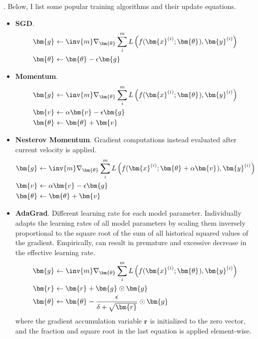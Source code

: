 \documentclass[11pt]{article}
\renewcommand\vec[2][]{\bm{#2}_{#1}}
\newcommand\myspace[1][]{\vspace{#1\bigskipamount}}
\newcommand\p{\Needspace{10\baselineskip} \noindent}
\begin{document}
\myspace
\p {}. Below, I list some popular training algorithms and their update equations. 

\begin{itemize}
	\item \textbf{SGD}.
	\begin{align}
		\vec g &\leftarrow \inv{m} \nabla_{\vec \theta} \sum_i^m L\left(  f(\vec{x}^{(i)}; \vec \theta), \vec{y}^{(i)}   \right) \\
		\vec{\theta} &\leftarrow \vec \theta - \epsilon \vec g
	\end{align}
	
	\item \textbf{Momentum}.
	\begin{align}
		\vec{g} &\leftarrow \inv{m} \nabla_{\vec \theta} \sum_i^m L\left(  f(\vec{x}^{(i)}; \vec \theta), \vec{y}^{(i)}   \right) \\
		\vec{v} &\leftarrow \alpha \vec{v} - \epsilon \vec{g} \\
		\vec{\theta} &\leftarrow \vec \theta + \vec{v} 
	\end{align}
	
	\item \textbf{Nesterov Momentum}. Gradient computations instead evaluated after current velocity is applied.
	\begin{align}
		\vec{g} &\leftarrow \inv{m} \nabla_{\vec \theta} \sum_i^m L\left(  f(\vec{x}^{(i)}; \vec{\theta} + \alpha \vec{v}), \vec{y}^{(i)} \right) \\
		\vec{v} &\leftarrow \alpha \vec{v} - \epsilon \vec{g} \\
		\vec{\theta} &\leftarrow \vec \theta + \vec{v} 
	\end{align}
	
	\item \textbf{AdaGrad}. Different learning rate for each model parameter. Individually adapts the learning rates of all model parameters by scaling them inversely proportional to the square root of the sum of all historical squared values of the gradient. Empirically, can result in premature and excessive decrease in the effective learning rate. 
	\begin{align}
		\vec g &\leftarrow \inv{m} \nabla_{\vec \theta} \sum_i^m L\left(  f(\vec{x}^{(i)}; \vec \theta), \vec{y}^{(i)}   \right) \\
		\vec{r} &\leftarrow \vec{r} + \vec{g} \odot \vec{g} \\
		\vec{\theta} &\leftarrow \vec \theta - \frac{\epsilon}{\delta + \sqrt{\vec{r}}}  \odot\vec g
	\end{align}
	where the gradient accumulation variable $\vec{r}$ is initialized to the zero vector, and the fraction and square root in the last equation is applied element-wise.
	

\end{itemize}
\end{document}
